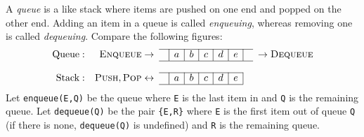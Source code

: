 \documentclass[11pt,a4paper]{article}
\author{Christian Rinderknecht}
\date{25 April 2008}
\begin{document}
\maketitle

\thispagestyle{empty}

\noindent A \emph{queue} is a like stack where items are pushed on one
end and popped on the other end. Adding an item in a queue is called
\emph{enqueuing}, whereas removing one is called
\emph{dequeuing}. Compare the following figures:
\[
\begin{array}{rr@{\;}cc|c|c|c|c|c|cc@{\;}l}
\cline{4-10}
\text{Queue}: & \textsc{Enqueue} & \rightarrow & & a & b & c & d & e &
& \rightarrow & \textsc{Dequeue}\\
\cline{4-10}\\
\cline{4-9}
\text{Stack}: & \textsc{Push}, \textsc{Pop} & \leftrightarrow & & a &
b & c & d & e &&&\\
\cline{4-9}
\end{array}
\]
\noindent Let \texttt{enqueue(E,Q)} be the queue where \texttt{E} is
the last item in and \texttt{Q} is the remaining queue. Let
\texttt{dequeue(Q)} be the pair \texttt{\{E,R\}} where \texttt{E} is
the first item out of queue \texttt{Q} (if there is none,
\texttt{dequeue(Q)} is undefined) and \texttt{R} is the remaining
queue.

\bigskip



\end{document}
